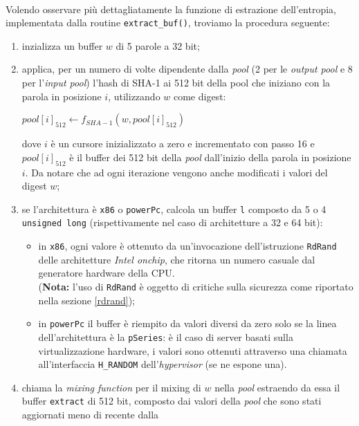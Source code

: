 \documentclass{article}
\begin{document}
 \paragraph{} Volendo osservare più dettagliatamente la funzione di estrazione
 dell'entropia, implementata dalla routine
 \verb+extract_buf()+, troviamo la procedura seguente:
 \begin{enumerate}
   \item inzializza un buffer $w$ di 5 parole a 32 bit;
   \item applica, per un numero di volte dipendente dalla \emph{pool} (2 per le
   \emph{output pool} e 8 per l'\emph{input pool})  l'hash di SHA-1 ai 512 bit
   della pool che iniziano con la parola in posizione $i$, utilizzando $w$ come
   digest:
   \begin{center}
   $pool\left[i\right]_{512}\leftarrow f_{SHA-1}(w, pool\left[i\right]_{512})$
   \end{center}
   dove $i$ è un cursore inizializzato a zero e incrementato con passo 16 e
   $pool\left[i\right]_{512}$ è il buffer dei 512 bit della \emph{pool}
   dall'inizio della parola in posizione $i$. Da notare che ad ogni iterazione
   vengono anche modificati i valori del digest $w$; 
   \item se l'architettura è \verb+x86+ o \verb+powerPc+, calcola un buffer
   \verb+l+ composto da 5 o 4 \verb+unsigned long+ (rispettivamente nel caso di
   architetture a 32 e 64 bit):
   \begin{itemize}
     \item in \verb+x86+, ogni valore è ottenuto da un'invocazione
     dell'istruzione \verb+RdRand+ delle architetture \emph{Intel onchip}, che
     ritorna un numero casuale dal generatore hardware della CPU.\\
     (\textbf{Nota:} l'uso di \verb+RdRand+ è oggetto di critiche sulla
     sicurezza come riportato nella sezione \ref{rdrand});
     \item in \verb+powerPc+ il buffer è riempito da valori diversi da zero 
     solo se la linea dell'architettura è la \verb+pSeries+: è il
     caso di server basati sulla virtualizzazione hardware, i valori sono
     ottenuti attraverso una chiamata all'interfaccia \verb+H_RANDOM+
     dell'\emph{hypervisor} (se ne espone una).
   \end{itemize} 
   \item chiama la \emph{mixing function} per il mixing di $w$ nella
   \emph{pool} estraendo da essa il buffer \verb+extract+ di 512 bit, composto
   dai valori della \emph{pool} che sono stati aggiornati meno di recente dalla

\end{enumerate}
\end{document}
